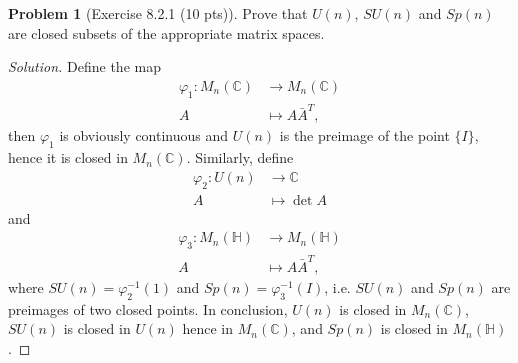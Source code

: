 \documentclass{article}
\theoremstyle{definition}
\newtheorem{problem}{Problem}
\theoremstyle{plain}
\begin{document}
\begin{problem}[Exercise 8.2.1 (10 pts)]
Prove that $U(n)$, $SU(n)$ and $Sp(n)$ are closed subsets of the appropriate matrix spaces.
\end{problem}
\begin{adjustwidth}{0.7cm}{}
\color{blue}
\begin{proof}[Solution]
Define the map
\begin{align*}
\varphi_1:M_n(\mathbb{C})&\to M_n(\mathbb{C})\\
A&\mapsto A\bar{A}^T,
\end{align*}
then $\varphi_1$ is obviously continuous and $U(n)$ is the preimage of the point $\{I\}$, hence it is closed in $M_n(\mathbb{C})$. Similarly, define
\begin{align*}
\varphi_2:U(n)&\to\mathbb{C}\\
A&\mapsto\det A
\end{align*}
and
\begin{align*}
\varphi_3:M_n(\mathbb{H})&\to M_n(\mathbb{H})\\
A&\mapsto A\bar{A}^T,
\end{align*}
where $SU(n)=\varphi_2^{-1}(1)$ and $Sp(n)=\varphi_3^{-1}(I)$, i.e. $SU(n)$ and $Sp(n)$ are preimages of two closed points. In conclusion, $U(n)$ is closed in $M_n(\mathbb{C})$, $SU(n)$ is closed in $U(n)$ hence in $M_n(\mathbb{C})$, and $Sp(n)$ is closed in $M_n(\mathbb{H})$.
\color{black}
\end{proof}
\end{adjustwidth}
\end{document}
